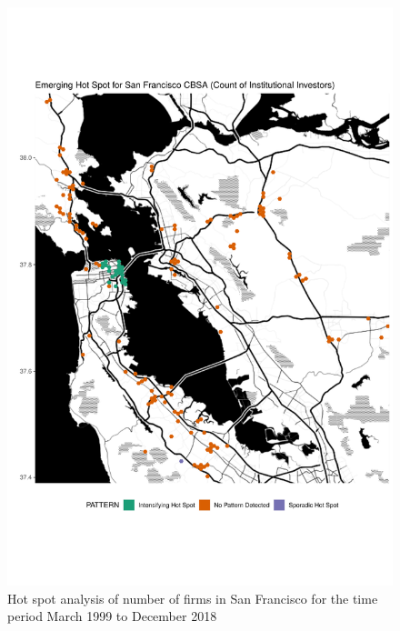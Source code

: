 \begin{figure}
	\centering
	\includegraphics[width=1\linewidth]{Figures/ChapterIV/SF_Count_EH}
	\caption[Hot Spot Analysis of Number of Firms in San Francisco CBSA 1999-2018]{Hot spot analysis of number of firms in San Francisco for the time period March 1999 to December 2018}
	\label{fig:SFcounthotspot}
\end{figure}


